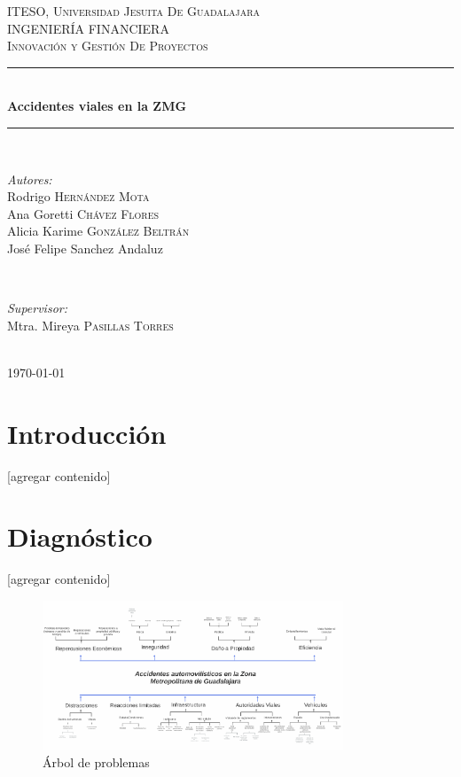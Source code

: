 \documentclass{article}
\begin{document}
\begin{titlepage}
\newcommand{\HRule}{\rule{\linewidth}{0.5mm}}

\center
\textsc{\LARGE ITESO, Universidad Jesuita De Guadalajara}\\[2cm]
\textsc{\Large INGENIERÍA FINANCIERA}\\[1cm]
\textsc{\large Innovación y Gestión De Proyectos}\\[1cm]
\HRule \\[2cm]
{ \huge \bfseries Accidentes viales en la ZMG}\\[2cm] 
\HRule \\[2cm]
\begin{minipage}{0.4\textwidth}
\begin{flushleft} \large


\emph{Autores:}\\
Rodrigo \textsc{Hernández Mota}\\
Ana Goretti \textsc{Chávez Flores}\\
Alicia Karime \textsc{González Beltrán}\\
José Felipe \textsc{}{Sanchez Andaluz}
\end{flushleft}
\end{minipage}
~
\begin{minipage}{0.4\textwidth}
\begin{flushright} \large
\emph{Supervisor:} \\
Mtra. Mireya \textsc{Pasillas Torres}
\end{flushright}
\end{minipage}\\[2cm]

{\large \today}\\[1cm]

\vfill
 
\end{titlepage}
\tableofcontents
\newpage

\section{Introducción}\label{sec:into}
[agregar contenido]

\section{Diagnóstico}\label{sec:diagnostic}

[agregar contenido]

	\begin{figure}[H]\centering
	\includegraphics[width=0.8\textwidth]{resources/img/arbol_de_problemas.png}
	\caption{\label{} Árbol de problemas}
    \end{figure}
\end{document}
